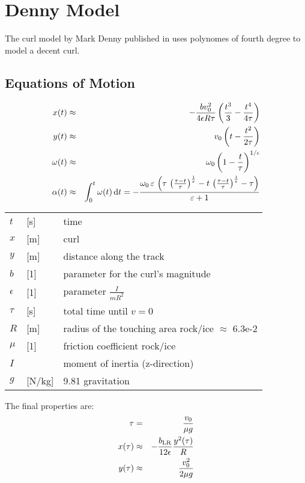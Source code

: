 \section{Denny Model}
The curl model by Mark Denny published in \cite{denny:98} uses polynomes of 
fourth degree to model a decent curl.

\subsection{Equations of Motion}
\begin{eqnarray}
\eqlab{denX}
x(t) &\approx& - \frac{ b v_0^2 }{ 4 \epsilon R \tau } \left( \frac{ t^3 }{ 3 } 
- \frac{ t^4 } { 4 \tau } \right) \\
\eqlab{denY}
y(t) &\approx& v_0 \left( t - \frac{ t^2 }{ 2\tau } \right) \\
\eqlab{denW}
\omega(t) &\approx& \omega_0 \left(1 - \frac{t}{\tau}\right)^{1/\epsilon} \\
\eqlab{denA}
\alpha(t) &\approx& \int_0^t \omega(t) \dt = 
-{{\omega_{0}\,\varepsilon\,\left(\tau\,\left({{\tau-t}\over{\tau}} 
\right)^{{{1}\over{\varepsilon}}}-t\,\left({{\tau-t}\over{\tau}} 
\right)^{{{1}\over{\varepsilon}}}-\tau\right)}\over{\varepsilon+1}}
\end{eqnarray}

\bigskip
\begin{tabular}{lll}
$t$		& [s] & time \\
$x$		& [m] & curl \\
$y$		& [m] & distance along the track \\
$b$ 	& [1] & parameter for the curl's magnitude \\
$\epsilon$	& [1] & parameter $ \frac{ I }{ mR^2 } $\\
$\tau$	& [s] & total time until $v=0$ \\
$R$		& [m] & radius of the touching area rock/ice $\approx$ 6.3e-2 \\
$\mu$	& [1] & friction coefficient rock/ice \\
$I$		&  & moment of inertia (z-direction) \\
$g$		& [N/kg] & 9.81 gravitation \\
\end{tabular}
\bigskip

The final properties are:
\begin{eqnarray}
\eqlab{denTau}
\tau    & = &     \frac{ v_0 }{ \mu g } \\
x(\tau) &\approx& - \frac{ b_\mathrm{LR} }{ 12\epsilon } \frac{y^2(\tau) }{R} \\
y(\tau) &\approx& \frac{ v_0^2 }{ 2\mu g }
\end{eqnarray}

